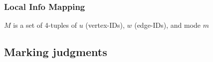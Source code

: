 \subsubsection{Local Info Mapping}

%
$M$ is a set of 4-tuples of $u$ (vertex-IDs), $w$ (edge-IDs), \ctx and mode $m$



\subsection{Marking judgments}

